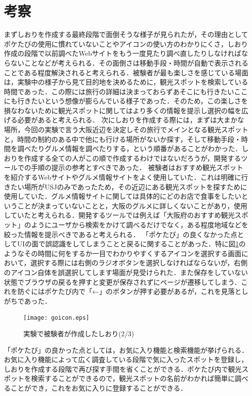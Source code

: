 \documentclass{funthesis}
\begin{document}
\section{考察}
まずしおりを作成する最終段階で面倒そうな様子が見られたが，その理由としてポケたびの使用に慣れていないことやアイコンの使い方のわかりにくさ，しおり作成の段階で以前調べたWebサイトをもう一度見たり調べ直したりしなければならないことなどが考えられる．その面倒さは移動手段・時間が自動で表示されることである程度解決されると考えられる．被験者が最も楽しさを感じている場面は，実験中の様子から見て目的地を決めるために，観光スポットを検索している時間であった．この際には旅行の詳細は決まっておらずあそこにも行きたいここにも行きたいという想像が膨らんでいる様子であった．そのため，この楽しさを損なわないために観光スポットに関してはより多くの情報を提示し選択の幅を広げる必要があると考えられる．
次にしおりを作成する際には，まずは大まかな場所，今回の実験で言う大阪近辺を決定しその旅行でメインとなる観光スポットと，時間の制約のある中で他にも行ける場所がないか探す，そして移動手段・時間を調べたりグルメ情報を調べたりする，という順番があることがわかった．しおりを作成する全ての人がこの順で作成するわけではないだろうが，開発するツールでの手順の提示の参考とすべきであった．
被験者はおすすめ観光スポットを紹介するWebサイトやグルメ情報サイトをよく使用していた．これは明確に行きたい場所がUSJのみであったため，その近辺にある観光スポットを探すために使用していた．グルメ情報サイトに関しては具体的にどのお店で食事をしたいということが決まっていないことと，大阪のグルメに詳しくないことがあり，使用していたと考えられる．開発するツールでは例えば「大阪府のおすすめ観光スポット」のようにユーザから検索をかけて調べるだけでなく，ある程度地域などを絞った情報を提示べきであると考えられる．
「ポケたび」の良くなかった点としてUIの面で誤認識をしてしまうことと戻るに関することがあった．特に図\ref{Lgoicon}のようなその時間に何をするか一目でわかりやすくするアイコンを選択する画面において，選択する際には右側のラジオボタンを選択しなければならないが，右側のアイコン自体を誤選択してします場面が見受けられた．また保存をしていない状態でブラウザの戻るを押すと変更が保存されずにページが遷移してしまう．これを防ぐにはポケたび内で「←」のボタンが押す必要があるが，これを見落としがちであった．
\begin{figure}[htpb]
\begin{center}
\texttt{[image: goicon.eps]}
\end{center}
\caption{実験で被験者が作成したしおり(2/3)}
\label{Lgoicon}
\end{figure}

「ポケたび」の良かった点としては，お気に入り機能と検索機能が挙げられる．お気に入り機能によって広く調査している段階で気に入ったスポットを登録し，しおりを作成する段階で再び探す手間を省くことができる．ポケたび内で観光スポットを検索することができるので，観光スポットの名前がわかれば簡単に調べることができ，これをお気に入りに登録することができる．
\end{document}
